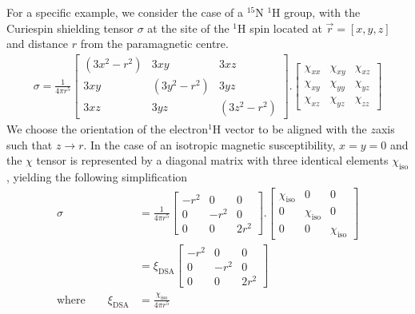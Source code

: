 \documentclass[a4paper,10pt,english,openany,oneside]{sphinxmanual}
\begin{document}
\sphinxAtStartPar
For a specific example, we consider the case of a $^{\text{15}}$N \sphinxhyphen{} $^{\text{1}}$H group, with the Curie\sphinxhyphen{}spin shielding tensor \(\sigma\) at the site of the $^{\text{1}}$H spin located at \(\vec r=[x,y,z]\) and distance \(r\) from the paramagnetic centre.
\begin{equation*}
\begin{split}\sigma = \frac{1}{4\pi r^5}
\begin{bmatrix}
(3x^2-r^2) & 3xy & 3xz\\
3xy & (3y^2-r^2) & 3yz\\
3xz & 3yz & (3z^2 - r^2)
\end{bmatrix}.
\begin{bmatrix}
\chi_{xx} & \chi_{xy} & \chi_{xz}\\
\chi_{xy} & \chi_{yy} & \chi_{yz}\\
\chi_{xz} & \chi_{yz} & \chi_{zz}
\end{bmatrix}\end{split}
\end{equation*}
\sphinxAtStartPar
We  choose the orientation of the electron\textendash{}$^{\text{1}}$H vector to be aligned with the \(z\)\sphinxhyphen{}axis such that \(z\rightarrow r\). In the case of an isotropic magnetic susceptibility, \(x=y=0\) and the \(\chi\) tensor is represented by a diagonal matrix with three identical elements \(\chi_\text{iso}\), yielding the following simplification
\begin{equation*}
\begin{split}\sigma &= \frac{1}{4\pi r^5}
\begin{bmatrix}
-r^2 & 0 & 0\\
0 & -r^2 & 0\\
0 & 0 & 2r^2
\end{bmatrix}.
\begin{bmatrix}
\chi_\text{iso} & 0 & 0\\
0 & \chi_\text{iso} & 0\\
0 & 0 & \chi_\text{iso}
\end{bmatrix}\\
&= \xi_\text{DSA}
\begin{bmatrix}
-r^2 & 0 & 0\\
0 & -r^2 & 0\\
0 & 0 & 2r^2
\end{bmatrix}\\
\text{where} \qquad \xi_\text{DSA}&=\frac{\chi_\text{iso}}{4\pi r^5}\end{split}
\end{equation*}
\end{document}
